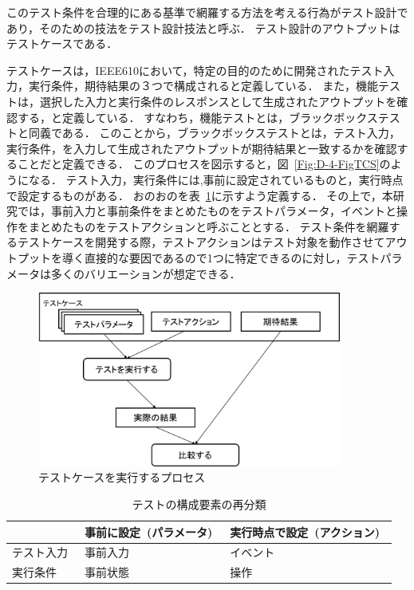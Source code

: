 このテスト条件を合理的にある基準で網羅する方法を考える行為がテスト設計であり，そのための技法をテスト設計技法と呼ぶ．
テスト設計のアウトプットはテストケースである．

テストケースは，IEEE610において，特定の目的のために開発されたテスト入力，実行条件，期待結果の３つで構成されると定義している．
また，機能テストは，選択した入力と実行条件のレスポンスとして生成されたアウトプットを確認する，と定義している\cite{IEEE610.12-90}．
すなわち，機能テストとは，ブラックボックステストと同義である．
このことから，ブラックボックステストとは，テスト入力，実行条件，を入力して生成されたアウトプットが期待結果と一致するかを確認することだと定義できる．
このプロセスを図示すると，図~\ref{Fig:D-4-FigTCS}のようになる．
テスト入力，実行条件には,事前に設定されているものと，実行時点で設定するものがある．
おのおのを表~\ref{tab:D-4-FigTPS}に示すよう定義する\cite{013}．
その上で，本研究では，事前入力と事前条件をまとめたものをテストパラメータ，イベントと操作をまとめたものをテストアクションと呼ぶこととする．
テスト条件を網羅するテストケースを開発する際，テストアクションはテスト対象を動作させてアウトプットを導く直接的な要因であるので1つに特定できるのに対し，テストパラメータは多くのバリエーションが想定できる．

\begin{figure}[h]
  \begin{center}
  \includegraphics[width=10cm]{./image/D-2-FigTCS.png}
  \caption{テストケースを実行するプロセス}
  \label{fig:D-4-FigTCS}
  \end{center}
   \end{figure}

\begin{table}[htbp]
  \centering
  \caption{テストの構成要素の再分類}
    \begin{tabular}{|l|l|l|}
    \hline
          & 事前に設定 (パラメータ)  & 実行時点で設定 (アクション)  \bigstrut\\
    \hline
    テスト入力  & 事前入力  & イベント  \bigstrut\\
    \hline
    実行条件  & 事前状態  & 操作  \bigstrut\\
    \hline
    \end{tabular}%
  \label{tab:D-4-FigTPS}%
\end{table}%


